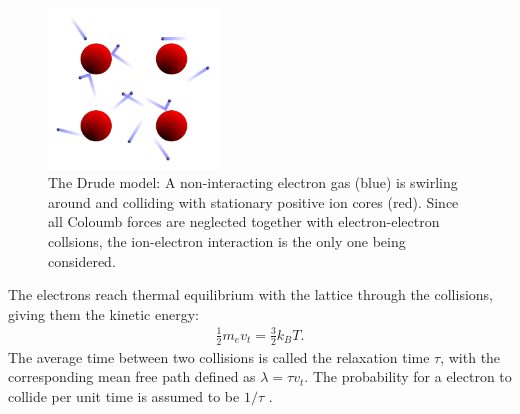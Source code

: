 \begin{figure}[h!]
  \centering
   \includegraphics[width=0.4\textwidth]{Figures/DrudeModel.pdf}
   \caption{ 
      The Drude model: A non-interacting electron gas (blue) is swirling around and colliding with 
      stationary positive ion cores (red). 
      Since all Coloumb forces are neglected together with electron-electron
      collsions, the ion-electron interaction is the only one being considered.
   }
   \label{fig:DrudeModel}
\end{figure}
%
The electrons reach thermal equilibrium with the lattice through the collisions, giving them
the kinetic energy:
\begin{align}
   \frac{1}{2}m_e v_t = \frac{3}{2}k_B T.
\end{align}
The average time between two collisions is called the relaxation time $\tau$, with the 
corresponding mean free path defined as $\lambda  = \tau v_t$. The probability for a 
electron to collide per unit time is assumed to be $1/\tau$ \cite[p.~71-72]{Hofmann}. 


